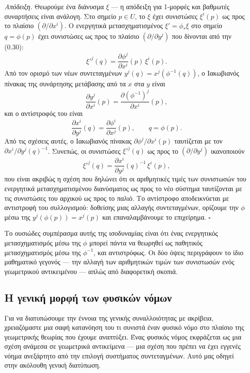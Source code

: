 \documentclass[12pt]{article}
\begin{document}
\textit{Απόδειξη.} Θεωρούμε ένα διάνυσμα $\xi$ — η απόδειξη για 1-μορφές και βαθμωτές συναρτήσεις είναι ανάλογη. Στο σημείο $p \in U$, το $\xi$ έχει συνιστώσες $\xi^i(p)$ ως προς το πλαίσιο $(\partial / \partial x^i)$. Ο ενεργητικά μετασχηματισμένος $\xi' = \phi_* \xi$ στο σημείο $q = \phi(p)$ έχει συνιστώσες ως προς το πλαίσιο $(\partial / \partial y^j)$ που δίνονται από την (0.30):
\[
\xi'^j(q) = \frac{\partial \phi^j}{\partial x^i}(p) \, \xi^i(p).
\]
Από τον ορισμό των νέων συντεταγμένων $y^j(q) = x^j(\phi^{-1}(q))$, ο Ιακωβιανός πίνακας της συνάρτησης μετάβασης από τα $x$ στα $y$ είναι
\[
\frac{\partial y^j}{\partial x^i}(p) = \frac{\partial (\phi^{-1})^j}{\partial x^i}(p),
\]
και ο αντίστροφός του είναι
\[
\frac{\partial x^i}{\partial y^j}(q) = \frac{\partial \phi^i}{\partial x^j}(p), \qquad q = \phi(p).
\]
Από τις σχέσεις αυτές, ο Ιακωβιανός πίνακας $\partial \phi^j / \partial x^i(p)$ ταυτίζεται με τον $\partial x^i / \partial y^j(q)^{-1}$. Συνεπώς, οι συνιστώσες $\xi'^j(q)$ ως προς το $(\partial / \partial y^j)$ ικανοποιούν
\[
\xi'^j(q) = \frac{\partial x^i}{\partial y^j}(q)^{-1} \, \xi^i(p),
\]
που είναι ακριβώς η σχέση που δηλώνει ότι οι αριθμητικές τιμές των συνιστωσών του ενεργητικά μετασχηματισμένου διανύσματος ως προς το νέο σύστημα ταυτίζονται με τις συνιστώσες του αρχικού ως προς το παλιό. Το αντίστροφο αποδεικνύεται με αντιστροφή του συλλογισμού: δοθείσης μιας αλλαγής συντεταγμένων, ορίζουμε την $\phi$ μέσω της $y^j(\phi(p)) = x^j(p)$ και επαναλαμβάνουμε το επιχείρημα. $\square$

Το ουσιώδες συμπέρασμα αυτής της ισοδυναμίας είναι ότι ένας ενεργητικός μετασχηματισμός μέσω της $\phi$ μπορεί πάντα να θεωρηθεί ως παθητικός μετασχηματισμός μέσω της $\phi^{-1}$, και αντιστρόφως. Οι δύο όψεις περιγράφουν το ίδιο μαθηματικό γεγονός — την αλλαγή των αριθμητικών τιμών των συνιστωσών ενός γεωμετρικού αντικειμένου — απλώς από διαφορετική σκοπιά.

\subsection{Η γενική μορφή των φυσικών νόμων}

Για να διατυπώσουμε την έννοια της γενικής συναλλοιότητας με ακρίβεια, χρειαζόμαστε μια σαφή κατανόηση του τι συνιστά έναν φυσικό νόμο στο πλαίσιο της γεωμετρικής θεωρίας που έχουμε αναπτύξει. Ένας φυσικός νόμος εκφράζεται ως μια σχέση ανάμεσα σε γεωμετρικά αντικείμενα — μια σχέση που πρέπει να έχει εγγενές νόημα ανεξάρτητο από την επιλογή συστήματος συντεταγμένων. Αυτό μας οδηγεί στην ακόλουθη γενική διατύπωση.
\end{document}
